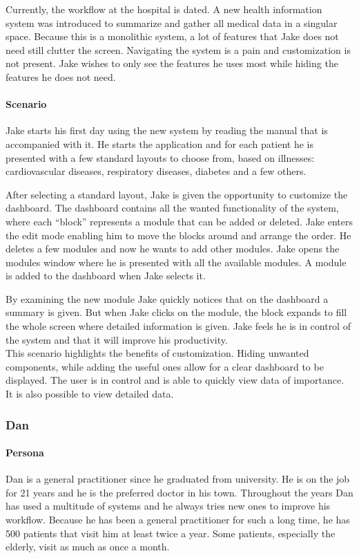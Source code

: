         Currently, the workflow at the hospital is dated. A new health information system was introduced to summarize and gather all medical data in a singular space. Because this is a monolithic system, a lot of features that Jake does not need still clutter the screen. Navigating the system is a pain and customization is not present. Jake wishes to only see the features he uses most while hiding the features he does not need.
        
        \paragraph{Scenario} Jake starts his first day using the new system by reading the manual that is accompanied with it. He starts the application and for each patient he is presented with a few standard layouts to choose from, based on illnesses: cardiovascular diseases, respiratory diseases, diabetes and a few others.

        After selecting a standard layout, Jake is given the opportunity to customize the dashboard. The dashboard contains all the wanted functionality of the system, where each ``block'' represents a module that can be added or deleted. Jake enters the edit mode enabling him to move the blocks around and arrange the order. He deletes a few modules and now he wants to add other modules. Jake opens the modules window where he is presented with all the available modules. A module is added to the dashboard when Jake selects it.

        By examining the new module Jake quickly notices that on the dashboard a summary is given. But when Jake clicks on the module, the block expands to fill the whole screen where detailed information is given. Jake feels he is in control of the system and that it will improve his productivity.\\

        \noindent This scenario highlights the benefits of customization. Hiding unwanted components, while adding the useful ones allow for a clear dashboard to be displayed. The user is in control and is able to quickly view data of importance. It is also possible to view detailed data.
        
        \subsubsection{Dan}

        \paragraph{Persona} Dan is a general practitioner since he graduated from university. He is on the job for 21 years and he is the preferred doctor in his town. Throughout the years Dan has used a multitude of systems and he always tries new ones to improve his workflow. Because he has been a general practitioner for such a long time, he has 500 patients that visit him at least twice a year. Some patients, especially the elderly, visit as much as once a month.

